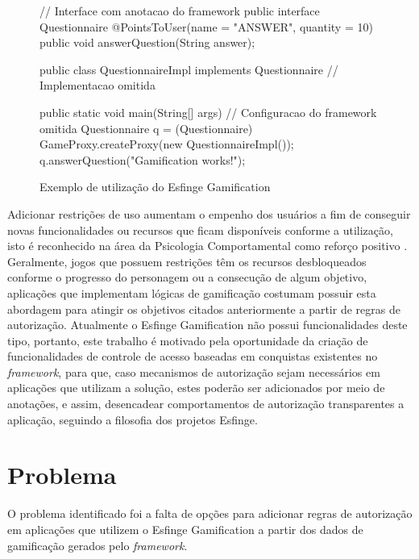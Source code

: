 \begin{figure}[H]
    \centering
    \caption{Exemplo de utilização do Esfinge Gamification}
    \begin{java}

// Interface com anotacao do framework
public interface Questionnaire {
    @PointsToUser(name = "ANSWER", quantity = 10)
    public void answerQuestion(String answer);
}

public class QuestionnaireImpl implements Questionnaire {
    // Implementacao omitida
}

public static void main(String[] args) {
    // Configuracao do framework omitida
    Questionnaire q = (Questionnaire) GameProxy.createProxy(new QuestionnaireImpl());
    q.answerQuestion("Gamification works!");
}
\end{java}
    \label{fig:esfingesample}
\end{figure}

\par Adicionar restrições de uso aumentam o empenho dos usuários a fim de conseguir novas funcionalidades ou recursos que ficam disponíveis conforme a utilização, isto é reconhecido na área da Psicologia Comportamental como reforço positivo  \cite{skinner1990behavior}. Geralmente, jogos que possuem restrições têm os recursos desbloqueados conforme o progresso do personagem ou a consecução de algum objetivo, aplicações que implementam lógicas de gamificação costumam possuir esta abordagem para atingir os objetivos citados anteriormente a partir de regras de autorização. Atualmente o Esfinge Gamification não possui funcionalidades deste tipo, portanto, este trabalho é motivado pela oportunidade da criação de funcionalidades de controle de acesso baseadas em conquistas existentes no \textit{framework}, para que, caso mecanismos de autorização sejam necessários em aplicações que utilizam a solução, estes poderão ser adicionados por meio de anotações, e assim, desencadear comportamentos de autorização transparentes a aplicação, seguindo a filosofia dos projetos Esfinge.

\section{Problema}

\par O problema identificado foi a falta de opções para adicionar regras de autorização em aplicações que utilizem o Esfinge Gamification a partir dos dados de gamificação gerados pelo \textit{framework}.

